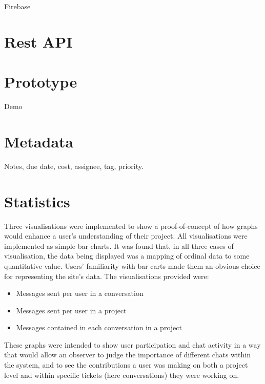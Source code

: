 \documentclass[a4paper]{l3proj}
\begin{document}
Firebase

\section{Rest API}
\label{restApi}


\section{Prototype}
\label{prototype}

Demo

\section{Metadata}
\label{metadata}

Notes, due date, cost, assignee, tag, priority.

\section{Statistics}
\label{statistics}

Three visualisations were implemented to show a proof-of-concept of how graphs would enhance a user’s understanding of their project. 
All visualisations were implemented as simple bar charts. It was found that, in all three cases of visualisation, the data being displayed was a mapping of ordinal data to some quantitative value. Users’ familiarity with bar carts made them an obvious choice for representing the site’s data. 
The visualisations provided were:

\begin{itemize}
\item Messages sent per user in a conversation
\item Messages sent per user in a project
\item Messages contained in each conversation in a project
\end{itemize}

These graphs were intended to show user participation and chat activity in a way that would allow an observer to judge the importance of different chats within the system, and to see the contributions a user was making on both a project level and within specific tickets (here conversations) they were working on.	
\end{document}
